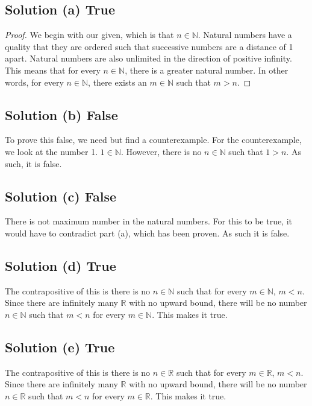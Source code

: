 \documentclass[12pt]{report}
\begin{document}
\subsection{Solution (a) True}
\begin{proof}
    We begin with our given, which is that $n \in \mathbb{N}$. 
    Natural numbers have a quality that they are ordered such that successive numbers are a distance of 1 apart.
    Natural numbers are also unlimited in the direction of positive infinity.
    This means that for every $n \in \mathbb{N}$, there is a greater natural number.
    In other words, for every $n \in \mathbb{N}$, there exists an $m \in \mathbb{N}$ such that $m > n$.
\end{proof}

\subsection{Solution (b) False}
To prove this false, we need but find a counterexample. 
For the counterexample, we look at the number 1. $1 \in \mathbb{N}$. However, there is no $n \in \mathbb{N}$ such that $1 > n$. As such, it is false.

\subsection{Solution (c) False}
There is not maximum number in the natural numbers. For this to be true, it would have to contradict part (a), which has been proven. As such it is false.

\subsection{Solution (d) True}
The contrapositive of this is there is no $n \in \mathbb{N}$ such that for every $m \in \mathbb{N}$, $m < n$. Since there are infinitely many $\mathbb{R}$ with no upward bound, there will be no number $n \in \mathbb{N}$ such that $m < n$ for every $m \in \mathbb{N}$. This makes it true.

\subsection{Solution (e) True}
The contrapositive of this is there is no $n \in \mathbb{R}$ such that for every $m \in \mathbb{R}$, $m < n$. Since there are infinitely many $\mathbb{R}$ with no upward bound, there will be no number $n \in \mathbb{R}$ such that $m < n$ for every $m \in \mathbb{R}$. This makes it true.
\end{document}
